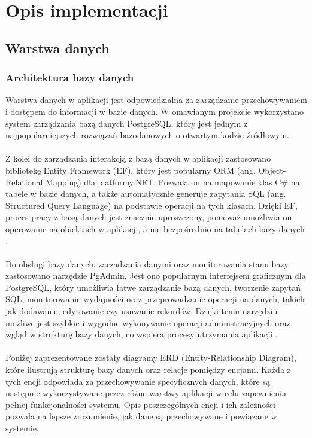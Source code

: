 \documentclass[twoside]{projektInzynierskiMS1}
\begin{document}
\newpage

\section{Opis implementacji}

\subsection{Warstwa danych}

\subsubsection{Architektura bazy danych}

\noindent
Warstwa danych w aplikacji jest odpowiedzialna za zarządzanie przechowywaniem i dostępem do informacji w bazie danych. W omawianym projekcie wykorzystano system zarządzania bazą danych PostgreSQL, który jest jednym z najpopularniejszych rozwiązań bazodanowych o otwartym kodzie źródłowym.
\\\\
Z kolei do zarządzania interakcją z bazą danych w aplikacji zastosowano bibliotekę Entity Framework (EF), który jest popularny ORM (ang. Object-Relational Mapping)  dla platformy.NET. Pozwala on na mapowanie klas C\# na tabele w bazie danych, a także automatycznie generuje zapytania SQL (ang. Structured Query Language) na podstawie operacji na tych klasach. Dzięki EF, proces pracy z bazą danych jest znacznie uproszczony, ponieważ umożliwia on operowanie na obiektach w aplikacji, a nie bezpośrednio na tabelach bazy danych \cite{EntityFramework}.
\\\\
Do obsługi bazy danych, zarządzania danymi oraz monitorowania stanu bazy zastosowano narzędzie PgAdmin. Jest ono popularnym interfejsem graficznym dla PostgreSQL, który umożliwia łatwe zarządzanie bazą danych, tworzenie zapytań SQL, monitorowanie wydajności oraz przeprowadzanie operacji na danych, takich jak dodawanie, edytowanie czy usuwanie rekordów. Dzięki temu narzędziu możliwe jest szybkie i wygodne wykonywanie operacji administracyjnych oraz wgląd w strukturę bazy danych, co wspiera procesy utrzymania aplikacji \cite{PgAdmin}.
\\\\
Poniżej zaprezentowane zostały diagramy ERD (Entity-Relationship Diagram), które ilustrują strukturę bazy danych oraz relacje pomiędzy encjami. Każda z tych encji odpowiada za przechowywanie specyficznych danych, które są następnie wykorzystywane przez różne warstwy aplikacji w celu zapewnienia pełnej funkcjonalności systemu. Opis poszczególnych encji i ich zależności pozwala na lepsze zrozumienie, jak dane są przechowywane i powiązane w systemie.
\end{document}

